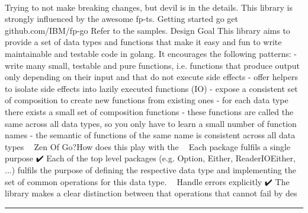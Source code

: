 \documentclass[10pt,a4paper]{article}
\begin{document}
\begin{multicols*}{2}
\paragraph{}
 Trying to not make breaking changes, but devil is in the details.
This library is strongly influenced by the awesome fp-ts.
Getting started
go get github.com/IBM/fp-go
Refer to the samples.
Design Goal
This library aims to provide a set of data types and functions that make it easy and fun to write maintainable and testable code in golang. It encourages the following patterns:
- write many small, testable and pure functions, i.e. functions that produce output only depending on their input and that do not execute side effects
- offer helpers to isolate side effects into lazily executed functions (IO)
- expose a consistent set of composition to create new functions from existing ones
- for each data type there exists a small set of composition functions
- these functions are called the same across all data types, so you only have to learn a small number of function names
- the semantic of functions of the same name is consistent across all data types
🧘🏽 Zen Of Go?How does this play with the
🧘🏽 Each package fulfils a single purpose
✔️ Each of the top level packages (e.g. Option, Either, ReaderIOEither, ...) fulfils the purpose of defining the respective data type and implementing the set of common operations for this data type.
🧘🏽 Handle errors explicitly
✔️ The library makes a clear distinction between that operations that cannot fail by des
\par\noindent\textcolor{red}{\rule{\linewidth}{0.2mm}}
\vfill
\null
\noindent\begin{minipage}{\linewidth}

\end{minipage}
\end{multicols*}
\end{document}
